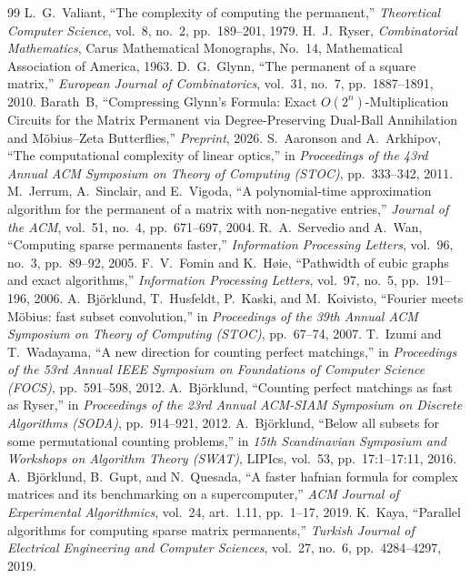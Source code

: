 \documentclass[11pt,a4paper]{article}
\theoremstyle{definition}
\begin{document}
\begin{thebibliography}{99}
 L.~G.~Valiant, ``The complexity of computing the permanent,'' \emph{Theoretical Computer Science}, vol.~8, no.~2, pp.~189--201, 1979.
 H.~J.~Ryser, \emph{Combinatorial Mathematics}, Carus Mathematical Monographs, No.~14, Mathematical Association of America, 1963.
 D.~G.~Glynn, ``The permanent of a square matrix,'' \emph{European Journal of Combinatorics}, vol.~31, no.~7, pp.~1887--1891, 2010.
 Barath~B, ``Compressing Glynn's Formula: Exact $O(2^n)$-Multiplication Circuits for the Matrix Permanent via Degree-Preserving Dual-Ball Annihilation and M\"obius--Zeta Butterflies,'' \emph{Preprint}, 2026.
 S.~Aaronson and A.~Arkhipov, ``The computational complexity of linear optics,'' in \emph{Proceedings of the 43rd Annual ACM Symposium on Theory of Computing (STOC)}, pp.~333--342, 2011.
 M.~Jerrum, A.~Sinclair, and E.~Vigoda, ``A polynomial-time approximation algorithm for the permanent of a matrix with non-negative entries,'' \emph{Journal of the ACM}, vol.~51, no.~4, pp.~671--697, 2004.
 R.~A.~Servedio and A.~Wan, ``Computing sparse permanents faster,'' \emph{Information Processing Letters}, vol.~96, no.~3, pp.~89--92, 2005.
 F.~V.~Fomin and K.~H\o ie, ``Pathwidth of cubic graphs and exact algorithms,'' \emph{Information Processing Letters}, vol.~97, no.~5, pp.~191--196, 2006.
 A.~Bj\"orklund, T.~Husfeldt, P.~Kaski, and M.~Koivisto, ``Fourier meets M\"obius: fast subset convolution,'' in \emph{Proceedings of the 39th Annual ACM Symposium on Theory of Computing (STOC)}, pp.~67--74, 2007.
 T.~Izumi and T.~Wadayama, ``A new direction for counting perfect matchings,'' in \emph{Proceedings of the 53rd Annual IEEE Symposium on Foundations of Computer Science (FOCS)}, pp.~591--598, 2012.
 A.~Bj\"orklund, ``Counting perfect matchings as fast as Ryser,'' in \emph{Proceedings of the 23rd Annual ACM-SIAM Symposium on Discrete Algorithms (SODA)}, pp.~914--921, 2012.
 A.~Bj\"orklund, ``Below all subsets for some permutational counting problems,'' in \emph{15th Scandinavian Symposium and Workshops on Algorithm Theory (SWAT)}, LIPIcs, vol.~53, pp.~17:1--17:11, 2016.
 A.~Bj\"orklund, B.~Gupt, and N.~Quesada, ``A faster hafnian formula for complex matrices and its benchmarking on a supercomputer,'' \emph{ACM Journal of Experimental Algorithmics}, vol.~24, art.~1.11, pp.~1--17, 2019.
 K.~Kaya, ``Parallel algorithms for computing sparse matrix permanents,'' \emph{Turkish Journal of Electrical Engineering and Computer Sciences}, vol.~27, no.~6, pp.~4284--4297, 2019.
\end{thebibliography}
\end{document}
